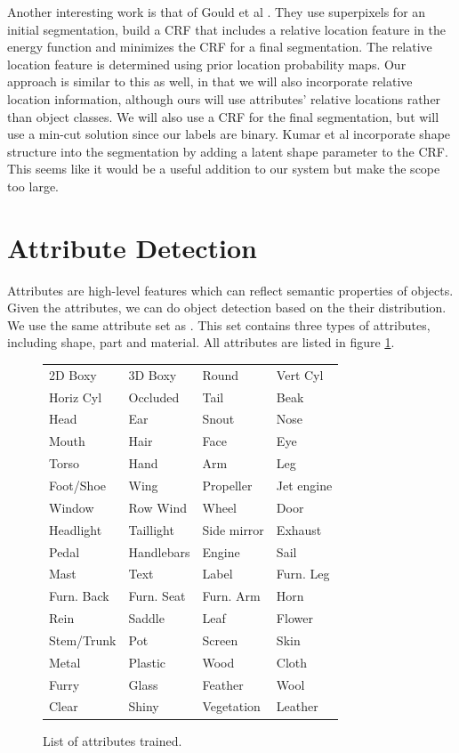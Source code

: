 \documentclass[10pt,twocolumn,letterpaper]{article}
\begin{document}
Another interesting work is that of Gould et al \cite{gould08}.  They use
superpixels for an initial segmentation, build a CRF that includes a
relative location feature in the energy function and minimizes the CRF
for a final segmentation.  The relative location feature is determined
using prior location probability maps.  Our approach is similar to this
as well, in that we will also incorporate relative location information,
although ours will use attributes' relative locations rather than object
classes.  We will also use a CRF for the final segmentation, but will
use a min-cut solution since our labels are binary.
Kumar et al \cite{kumar05} incorporate shape structure into the segmentation by
adding a latent shape parameter to the CRF.  This seems like it would be
a useful addition to our system but make the scope too large.

\section{Attribute Detection}
\label{sec:attribute}

Attributes are high-level features which can reflect semantic properties of objects. Given the attributes, we can do object detection based on the their distribution. We use the same attribute set as \cite{farhadi09}. This set contains three types of attributes, including shape, part and material. All attributes are listed in figure \ref{fig:atts}.

\begin{figure}
\begin{tabular}{llll}
2D Boxy & 3D Boxy & Round & Vert Cyl \\
Horiz Cyl & Occluded & Tail & Beak \\
Head & Ear & Snout & Nose \\
Mouth & Hair & Face & Eye \\
Torso & Hand & Arm & Leg \\
Foot/Shoe & Wing & Propeller & Jet engine \\
Window & Row Wind & Wheel & Door \\
Headlight & Taillight & Side mirror & Exhaust \\
Pedal & Handlebars & Engine & Sail \\
Mast & Text & Label & Furn. Leg \\
Furn. Back & Furn. Seat & Furn. Arm & Horn \\
Rein & Saddle & Leaf & Flower \\
Stem/Trunk & Pot & Screen & Skin \\
Metal & Plastic & Wood & Cloth \\
Furry & Glass & Feather & Wool \\
Clear & Shiny & Vegetation & Leather \\
\end{tabular}
\caption{List of attributes trained.}
\label{fig:atts}
\end{figure}
\end{document}

